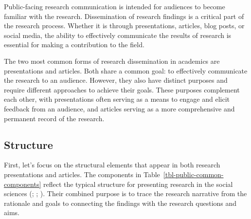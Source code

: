 \documentclass[
  letterpaper,
]{latex/krantz}
\theoremstyle{definition}
\theoremstyle{remark}
\begin{document}
Public-facing research communication is intended for audiences to become
familiar with the research. Dissemination of research findings is a
critical part of the research process. Whether it is through
presentations, articles, blog posts, or social media, the ability to
effectively communicate the results of research is essential for making
a contribution to the field.

The two most common forms of research dissemination in academics are
presentations and articles. Both share a common goal: to effectively
communicate the research to an audience. However, they also have
distinct purposes and require different approaches to achieve their
goals. These purposes complement each other, with presentations often
serving as a means to engage and elicit feedback from an audience, and
articles serving as a more comprehensive and permanent record of the
research.

\subsection{Structure}\label{sec-contribute-public-structure}

First, let's focus on the structural elements that appear in both
research presentations and articles. The components in
Table~\ref{tbl-public-common-components} reflect the typical structure
for presenting research in the social sciences
(;
;
). Their
combined purpose is to trace the research narrative from the rationale
and goals to connecting the findings with the research questions and
aims.
\end{document}
